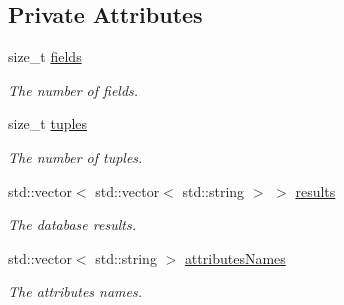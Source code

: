 \subsection*{Private Attributes}
\begin{DoxyCompactItemize}
\item 
\hypertarget{classDatabaseResult_a70c370d5776f3418bffc6f857ed56686}{
size\_\-t \hyperlink{classDatabaseResult_a70c370d5776f3418bffc6f857ed56686}{fields}}
\label{classDatabaseResult_a70c370d5776f3418bffc6f857ed56686}

\begin{DoxyCompactList}\small\item\em The number of fields. \item\end{DoxyCompactList}\item 
\hypertarget{classDatabaseResult_aed4fa350079f3355cac77d4b410fe6e6}{
size\_\-t \hyperlink{classDatabaseResult_aed4fa350079f3355cac77d4b410fe6e6}{tuples}}
\label{classDatabaseResult_aed4fa350079f3355cac77d4b410fe6e6}

\begin{DoxyCompactList}\small\item\em The number of tuples. \item\end{DoxyCompactList}\item 
\hypertarget{classDatabaseResult_aa24044607e6d64e1458b5454adf2b9c4}{
std::vector$<$ std::vector$<$ std::string $>$ $>$ \hyperlink{classDatabaseResult_aa24044607e6d64e1458b5454adf2b9c4}{results}}
\label{classDatabaseResult_aa24044607e6d64e1458b5454adf2b9c4}

\begin{DoxyCompactList}\small\item\em The database results. \item\end{DoxyCompactList}\item 
\hypertarget{classDatabaseResult_a5b1d5d56689f44d961f4f3d9bba188bf}{
std::vector$<$ std::string $>$ \hyperlink{classDatabaseResult_a5b1d5d56689f44d961f4f3d9bba188bf}{attributesNames}}
\label{classDatabaseResult_a5b1d5d56689f44d961f4f3d9bba188bf}

\begin{DoxyCompactList}\small\item\em The attributes names. \item\end{DoxyCompactList}\end{DoxyCompactItemize}


